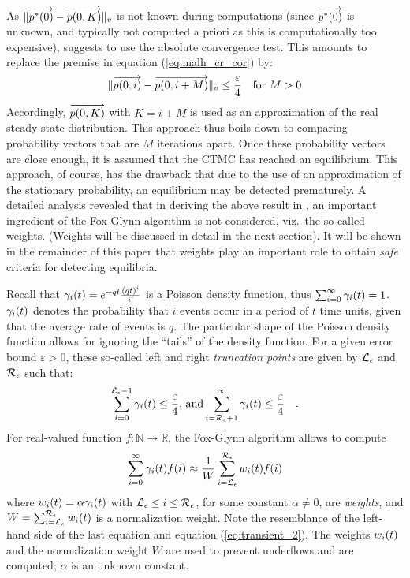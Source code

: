 \documentclass[times, 10pt,twocolumn]{article}
\begin{document}
		As $\lVert \overrightarrow{p^{*}(0)} - \overrightarrow{p(0,K)} \rVert_{v}$ is not known during computations (since $\overrightarrow{p^{*}(0)}$ is unknown, and typically not computed a priori as this is computationally too expensive), \cite{MalhotraMT_MR94} suggests to use the absolute convergence test.  This amounts to replace the premise in equation (\ref{eq:malh_cr_cor}) by:
		{\small
		\[
			\lVert \overrightarrow{p(0,i)} - \overrightarrow{p(0,i+M)} \rVert_{v} \leq \frac{\varepsilon}{4} \quad \mbox{for } M > 0
		\]
		}
		Accordingly, $\overrightarrow{p(0,K)}$ with $K = i{+}M$ is used as an approximation of the real steady-state distribution.  This approach thus boils down to comparing probability vectors that are $M$ iterations apart.  Once these probability vectors are close enough, it is assumed that the CTMC has reached an equilibrium.  This approach, of course, has the drawback that due to the use of an approximation of the stationary probability, an equilibrium may be detected prematurely.  A detailed analysis revealed that in deriving the above result in \cite{MalhotraMT_MR94},  an important ingredient of the Fox-Glynn algorithm is not considered, viz.\ the so-called weights.  (Weights will be discussed in detail in the next section).   It will be shown in the remainder of this paper that weights play an important role to obtain \emph{safe} criteria for detecting equilibria.

{}
	
	Recall that  $\gamma_{i}(t) = e^{-q t}\frac{\left( q t \right)^{i}}{i!}$ is a Poisson density function, thus $\sum_{i=0}^{\infty}\gamma_{i}(t) = 1$.  $\gamma_{i}(t)$ denotes the probability that $i$ events occur in a period of $t$ time units, given that the average rate of events is $q$.  The particular shape of the Poisson density function allows for ignoring the ``tails'' of the density function.  For a given error bound $\varepsilon > 0$, these so-called left and right \emph{truncation points} are given by $\mathcal{L}_{\epsilon}$ and $\mathcal{R}_{\epsilon}$ such that:
	\[
		\sum_{i=0}^{\mathcal{L}_{\epsilon}{-}1}\gamma_{i}(t) \leq \frac{\varepsilon}{4} \text{, and} \sum_{i=\mathcal{R}_{\epsilon}{+}1}^{\infty}\gamma_{i}(t) \leq \frac{\varepsilon}{4} \quad .
	\]
	For real-valued function $f : \mathbb{N} \to \mathbb{R}$, the Fox-Glynn algorithm \cite{FoxG_ACM88} allows to compute
	\[
	 	\sum_{i=0}^{\infty} \gamma_{i}(t) f(i) \approx \frac{1}{W}\sum_{i = \mathcal{L}_{\epsilon}}^{\mathcal{R}_{\epsilon}} w_{i}(t) f(i)
	\]
	 where $w_{i}(t) = \alpha \gamma_{i}(t)$ with $\mathcal{L}_{\epsilon} \leq i \leq \mathcal{R}_{\epsilon}$, for some constant $\alpha \neq 0$, are \emph{weights}, and $W = \sum_{i=\mathcal{L}_{\epsilon}}^{\mathcal{R}_{\epsilon}} w_{i}(t)$ is a normalization weight.  Note the resemblance of the left-hand side of the last equation and equation (\ref{eq:transient_2}).  The weights $w_{i}(t)$ and the normalization weight $W$ are used to prevent underflows and are computed; $\alpha$ is an unknown constant.
	
\end{document}
